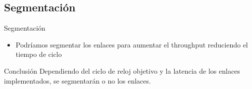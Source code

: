 \subsection{Segmentación}
\begin{frame}{Segmentación}
    \begin{itemize}
        \item Podríamos segmentar los enlaces para aumentar el throughput reduciendo el tiempo de ciclo
    \end{itemize}

    \begin{exampleblock}{Conclusión}
        Dependiendo del ciclo de reloj objetivo y la latencia de los enlaces implementados, se segmentarán o no los enlaces.
    \end{exampleblock}
\end{frame}